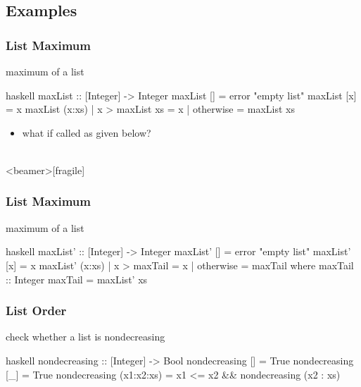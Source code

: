 \documentclass[dvipsnames]{beamer}
\theoremstyle{plain}
\begin{document}
\subsection{Examples}

\begin{frame}[fragile]
  \frametitle{List Maximum}

  \begin{exampleblock}{maximum of a list}
    \begin{pygments}{haskell}
maxList :: [Integer] -> Integer
maxList [] = error "empty list"
maxList [x] = x
maxList (x:xs)
  | x > maxList xs = x
  | otherwise      = maxList xs
    \end{pygments}
  \end{exampleblock}

  \pause
  \begin{itemize}
    \item what if called as given below?\\
      \\
  \end{itemize}
\end{frame}

\begin{frame}<beamer>[fragile]
  \frametitle{List Maximum}

  \begin{exampleblock}{maximum of a list}
    \begin{pygments}{haskell}
maxList' :: [Integer] -> Integer
maxList' [] = error "empty list"
maxList' [x] = x
maxList' (x:xs)
  | x > maxTail = x
  | otherwise   = maxTail
  where
    maxTail :: Integer
    maxTail = maxList' xs
    \end{pygments}
  \end{exampleblock}
\end{frame}

\begin{frame}[fragile]
  \frametitle{List Order}

  \begin{exampleblock}{check whether a list is nondecreasing}
    \begin{pygments}{haskell}
nondecreasing :: [Integer] -> Bool
nondecreasing [] = True
nondecreasing [_] = True
nondecreasing (x1:x2:xs) =
    x1 <= x2 && nondecreasing (x2 : xs)
    \end{pygments}
  \end{exampleblock}
\end{frame}
\end{document}
